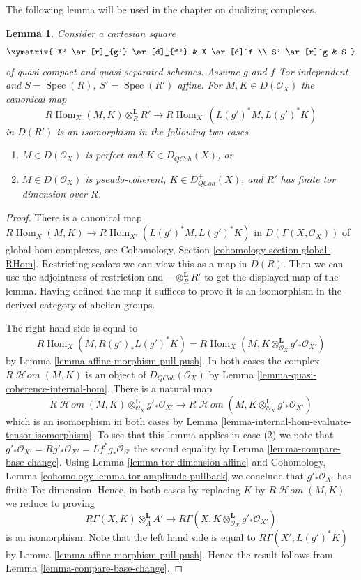 \documentclass{stacks-project}
\theoremstyle{plain}
\newtheorem{lemma}[subsection]{Lemma}
\theoremstyle{definition}
\theoremstyle{remark}
\numberwithin{equation}{subsection}
\def\Spec{\mathop{\mathrm{Spec}}}
\def\Hom{\mathop{\mathrm{Hom}}\nolimits}
\def\SheafHom{\mathop{\mathcal{H}\!\mathit{om}}\nolimits}
\def\QCoh{\mathit{QCoh}}
\begin{document}
\noindent
The following lemma will be used in the chapter on dualizing complexes.

\begin{lemma}
\label{lemma-affine-morphism-and-hom-out-of-perfect}
Consider a cartesian square
$$
\xymatrix{
X' \ar[r]_{g'} \ar[d]_{f'} & X \ar[d]^f \\
S' \ar[r]^g & S
}
$$
of quasi-compact and quasi-separated schemes. Assume $g$ and $f$
Tor independent and $S = \Spec(R)$, $S' = \Spec(R')$ affine. For
$M, K \in D(\mathcal{O}_X)$ the canonical map
$$
R\Hom_X(M, K) \otimes^\mathbf{L}_R R'
\longrightarrow
R\Hom_{X'}(L(g')^*M, L(g')^*K)
$$
in $D(R')$ is an isomorphism in the following two cases
\begin{enumerate}
\item $M \in D(\mathcal{O}_X)$ is perfect and $K \in D_\QCoh(X)$, or
\item $M \in D(\mathcal{O}_X)$ is pseudo-coherent,
$K \in D_\QCoh^+(X)$, and $R'$ has finite tor dimension over $R$.
\end{enumerate}
\end{lemma}

\begin{proof}
There is a canonical map
$R\Hom_X(M, K) \to R\Hom_{X'}(L(g')^*M, L(g')^*K)$
in $D(\Gamma(X, \mathcal{O}_X))$ of global hom complexes, see
Cohomology, Section \ref{cohomology-section-global-RHom}.
Restricting scalars we can view this as a map in $D(R)$.
Then we can use the adjointness of restriction and
$- \otimes_R^\mathbf{L} R'$ to get the displayed map of the lemma.
Having defined the map it suffices to prove it is an isomorphism
in the derived category of abelian groups.

\medskip\noindent
The right hand side is equal to
$$
R\Hom_X(M, R(g')_*L(g')^*K) =
R\Hom_X(M, K \otimes_{\mathcal{O}_X}^\mathbf{L} g'_*\mathcal{O}_{X'})
$$
by Lemma \ref{lemma-affine-morphism-pull-push}. In both cases the complex
$R\SheafHom(M, K)$ is an object of $D_\QCoh(\mathcal{O}_X)$ by
Lemma \ref{lemma-quasi-coherence-internal-hom}. There is a natural map
$$
R\SheafHom(M, K) \otimes_{\mathcal{O}_X}^\mathbf{L} g'_*\mathcal{O}_{X'}
\longrightarrow
R\SheafHom(M, K \otimes_{\mathcal{O}_X}^\mathbf{L} g'_*\mathcal{O}_{X'})
$$
which is an isomorphism in both cases by
Lemma \ref{lemma-internal-hom-evaluate-tensor-isomorphism}.
To see that this lemma applies in case (2) we note that
$g'_*\mathcal{O}_{X'} = Rg'_*\mathcal{O}_{X'} =
Lf^*g_*\mathcal{O}_{S'}$ the second equality by
Lemma \ref{lemma-compare-base-change}.
Using Lemma \ref{lemma-tor-dimension-affine} and
Cohomology, Lemma \ref{cohomology-lemma-tor-amplitude-pullback}
we conclude that $g'_*\mathcal{O}_{X'}$ has finite Tor dimension.
Hence, in both cases by replacing $K$ by $R\SheafHom(M, K)$ we reduce
to proving
$$
R\Gamma(X, K) \otimes^\mathbf{L}_A A' \longrightarrow
R\Gamma(X, K \otimes^\mathbf{L}_{\mathcal{O}_X} g'_*\mathcal{O}_{X'})
$$
is an isomorphism.
Note that the left hand side is equal to $R\Gamma(X', L(g')^*K)$
by Lemma \ref{lemma-affine-morphism-pull-push}.
Hence the result follows from
Lemma \ref{lemma-compare-base-change}.
\end{proof}
\end{document}
